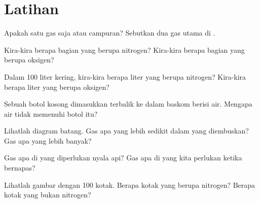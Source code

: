 \section{Latihan}

\begin{exercise}[$\star$]\label{exo:g4:air-a-mixture-of-gases:1}
Apakah  satu gas saja atau campuran? Sebutkan dua gas utama di
.
\end{exercise}

\begin{exercise}[$\star$]\label{exo:g4:air-a-mixture-of-gases:2}
Kira-kira berapa bagian  yang berupa nitrogen? Kira-kira berapa
bagian yang berupa oksigen?
\end{exercise}

\begin{exercise}[$\star$]\label{exo:g4:air-a-mixture-of-gases:3}
Dalam 100 liter  kering, kira-kira berapa liter yang berupa
nitrogen? Kira-kira berapa liter yang berupa oksigen?
\end{exercise}

\begin{exercise}[$\star$]\label{exo:g4:air-a-mixture-of-gases:4}
Sebuah botol kosong dimasukkan terbalik ke dalam baskom berisi air.
Mengapa air tidak memenuhi botol itu?
\end{exercise}

\begin{exercise}[$\star$]\label{exo:g4:air-a-mixture-of-gases:5}
Lihatlah diagram batang. Gas apa yang lebih sedikit dalam  yang
diembuskan? Gas apa yang lebih banyak?
\end{exercise}

\begin{exercise}[$\star$]\label{exo:g4:air-a-mixture-of-gases:6}
Gas apa di  yang diperlukan nyala api? Gas apa di  yang kita
perlukan ketika bernapas?
\end{exercise}

\begin{exercise}[$\star$]\label{exo:g4:air-a-mixture-of-gases:7}
Lihatlah gambar dengan 100 kotak. Berapa kotak yang berupa nitrogen?
Berapa kotak yang bukan nitrogen?
\end{exercise}

